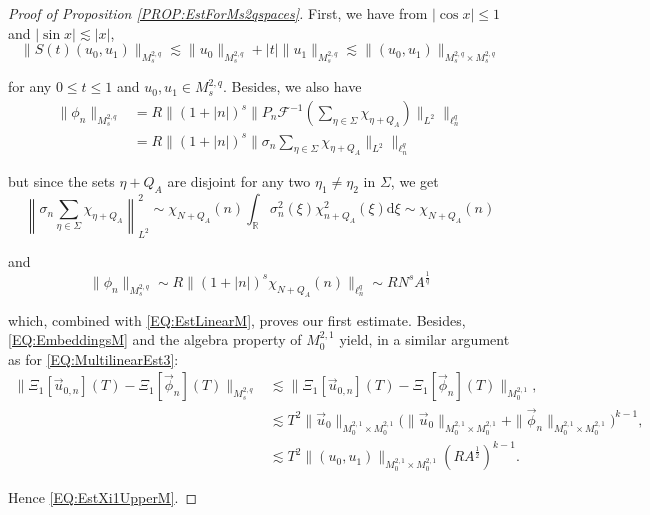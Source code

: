 \documentclass[letterpaper, 11pt,  reqno]{amsart}
\newcommand{\1}{\hspace{0.5mm}\text{I}\hspace{0.5mm}}
\newcommand{\noi}{\noindent}
\newcommand{\R}{\mathbb{R}}
\newcommand{\F}{\mathcal{F}}
\newcommand{\s}{\sigma}
\newcommand{\Si}{\Sigma}
\newcommand{\les}{\lesssim}
\numberwithin{equation}{section}
\numberwithin{theorem}{section}
\newcommand{\abs}[1]{\lvert#1\rvert}
\begin{document}
\begin{proof}[Proof of Proposition \ref{PROP:EstForMs2qspaces}]

First, we have from $\abs{ \cos x } \leq 1$ and $\abs{\sin x} \les \abs{x}$,
\begin{equation}
\label{EQ:EstLinearM}
\| S(t)(u_0 , u_1 ) \|_{M_s^{2,q}} \les \| u_0 \|_{M_s^{2,q}} + \abs{t} \| u_1 \|_{M_s^{2,q}} \les \| (u_0, u_1) \|_{M^{2,q}_s \times M^{2,q}_s}
\end{equation}

\noi for any $0 \leq t \leq 1$ and $u_0, u_1 \in M^{2,q}_s$. Besides, we also have 
\begin{align*}
\| \phi_n \|_{M_s^{2,q}}  & = R \big\| (1 + \abs{n})^s \| P_n \F^{-1}(\sum_{\eta \in \Si} \chi_{\eta + Q_A}) \|_{L^2} \big\|_{\ell^q_n} \\
	& =  R \big\| (1 + \abs{n})^s \| \s_n \sum_{\eta \in \Si} \chi_{\eta + Q_A} \|_{L^2} \big\|_{\ell^q_n}
\end{align*}

\noi but since the sets $\eta + Q_A$ are disjoint for any two $\eta_1 \neq \eta_2$ in $\Si$, we get
$$
\left\| \s_n \sum_{\eta \in \Si} \chi_{\eta + Q_A} \right\|^2_{L^2} \sim \chi_{N + Q_A} (n) \int_{\R} \s^2_n (\xi) \chi^2_{n + Q_A} (\xi) \mathrm{d}\xi \sim \chi_{N + Q_A} (n)
$$

\noi and
$$
\| \phi_n \|_{M_s^{2,q}} \sim R \| (1 + \abs{n} )^s \chi_{N + Q_A} (n)\|_{\ell^q_n} \sim RN^s A^{\frac 1q}
$$

\noi which, combined with \eqref{EQ:EstLinearM}, proves our first estimate. Besides, \eqref{EQ:EmbeddingsM} and the algebra property of $M^{2,1}_0$ yield, in a similar argument as for \eqref{EQ:MultilinearEst3}:
\begin{align*}
\|\Xi_1 [\vec{u}_{0, n}] (T) - \Xi_1 [\vec{\phi}_{ n}] (T)  \|_{M_s^{2,q}} & \les \|\Xi_1 [\vec{u}_{0, n}] (T) - \Xi_1 [\vec{\phi}_{ n}] (T)  \|_{M_0^{2,1}}, \\
	& \les T^2 \| \vec{u}_0 \|_{M^{2,1}_0 \times M^{2,1}_0} \big( \| \vec{u}_0 \|_{M^{2,1}_0 \times M^{2,1}_0} + \| \vec{\phi}_n \|_{M^{2,1}_0 \times M^{2,1}_0} \big)^{k-1}, \\
	& \les T^2 \| (u_0, u_1) \|_{M^{2,1}_0 \times M^{2,1}_0} (RA^{\frac 12})^{k-1}.
\end{align*}

\noi Hence \eqref{EQ:EstXi1UpperM}.










\end{proof}
\end{document}
